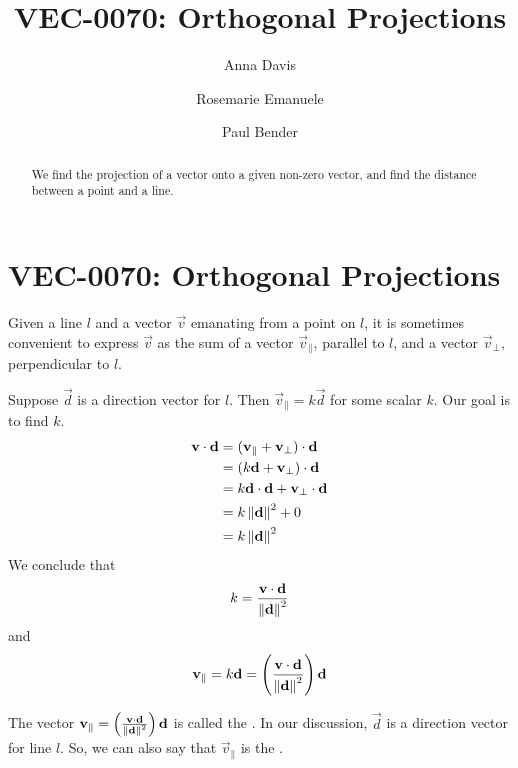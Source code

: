 \documentclass{ximera}
\author{Anna Davis \and Rosemarie Emanuele \and Paul Bender} \title{VEC-0070:  Orthogonal Projections} \license{CC-BY 4.0}
\begin{document}
\begin{abstract}
 We find the projection of a vector onto a given non-zero vector, and find the distance between a point and a line.
\end{abstract}
\maketitle

\section*{VEC-0070:  Orthogonal Projections}

Given a line $l$ and a vector $\vec{v}$ emanating from a point on $l$, it is sometimes convenient to express $\vec{v}$ as the sum of a vector $\vec{v}_{\parallel}$, parallel to $l$, and a vector $\vec{v}_{\perp}$, perpendicular to $l$.

\begin{center}

\end{center}

Suppose $\vec{d}$ is a direction vector for $l$.  Then $\vec{v}_
{\parallel}=k\vec{d}$ for some scalar $k$.  Our goal is to find $k$.  
\begin{align*}\mathbf{v}\cdot\mathbf{d}&=(\mathbf{v}_{\parallel}+\mathbf{v}_{\perp})\cdot\mathbf{d}\\
&=(k\mathbf{d}+\mathbf{v}_{\perp})\cdot\mathbf{d}\\
&=k\mathbf{d}\cdot\mathbf{d}+\mathbf{v}_{\perp}\cdot\mathbf{d}\\
&=k\left\lVert\mathbf{d}\right\rVert^2+0\\
&=k\left\lVert\mathbf{d}\right\rVert^2
\end{align*}
We conclude that $$k=\frac{\mathbf{v}\cdot\mathbf{d}}{\left\lVert\mathbf{d}\right\rVert^2}$$
and $$\mathbf{v}_{\parallel}=k\mathbf{d}=\left(\frac{\mathbf{v}\cdot\mathbf{d}}{\left\lVert\mathbf{d}\right\rVert^2}\right)\mathbf{d}$$

The vector $\mathbf{v}_{\parallel}=\left(\frac{\mathbf{v}\cdot\mathbf{d}}{\left\lVert\mathbf{d}\right\rVert^2}\right)\mathbf{d}$ is called the .  In our discussion, $\vec{d}$ is a direction vector for line $l$.  So, we can also say that $\vec{v}_{\parallel}$ is the .
\end{document}
